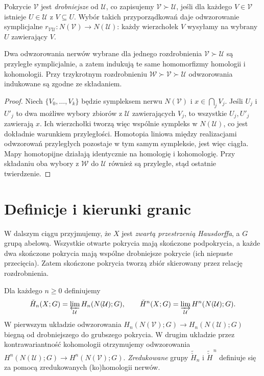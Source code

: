 \begin{definicja}[Rozdrobnienie]
Pokrycie $\mathcal V$ jest \emph{drobniejsze} od $\mathcal U$,
co zapisujemy $\mathcal V\succ\mathcal U$, jeśli dla każdego
$V\in\mathcal V$ istnieje $U\in\mathcal U$ z $V\subseteq U$.
Wybór takich przyporządkowań daje odwzorowanie symplicjalne
$r_{\mathcal V\mathcal U}:N(\mathcal V)\to N(\mathcal U)$:
każdy wierzchołek $V$ wysyłamy na wybrany $U$ zawierający $V$.
\end{definicja}

\begin{lemat}
\label{lem:cech-contiguity-v4}
Dwa odwzorowania nerwów wybrane dla jednego rozdrobnienia
$\mathcal V\succ\mathcal U$ są przyległe symplicjalnie,
a zatem indukują te same homomorfizmy homologii i kohomologii.
Przy trzykrotnym rozdrobnieniu $\mathcal W\succ\mathcal V\succ
\mathcal U$ odwzorowania indukowane są zgodne ze składaniem.
\end{lemat}
\begin{proof}
Niech $\{V_0,\ldots,V_k\}$ będzie sympleksem nerwu
$N(\mathcal V)$ i $x\in\bigcap_j V_j$.
Jeśli $U_j$ i $U'_j$ to dwa możliwe wybory zbiorów z
$\mathcal U$ zawierających $V_j$, to wszystkie $U_j,U'_j$
zawierają $x$. Ich wierzchołki tworzą więc wspólnie sympleks
w $N(\mathcal U)$, co jest dokładnie warunkiem przyległości.
Homotopia liniowa między realizacjami odwzorowań przyległych
pozostaje w tym samym sympleksie, jest więc ciągła.
Mapy homotopijne działają identycznie na homologię i kohomologię.
Przy składaniu oba wybory z $\mathcal W$ do $\mathcal U$
również są przyległe, stąd ostatnie twierdzenie.
\end{proof}

\section{Definicje i kierunki granic}
W dalszym ciągu przyjmujemy, że $X$ jest \emph{zwartą przestrzenią
Hausdorffa}, a $G$ grupą abelową. Wszystkie otwarte pokrycia
mają skończone podpokrycia, a każde dwa skończone pokrycia
mają wspólne drobniejsze pokrycie (ich niepuste przecięcia).
Zatem skończone pokrycia tworzą zbiór skierowany przez
relację rozdrobnienia.

\begin{definicja}
Dla każdego $n\ge0$ definiujemy
\[
\check H_n(X;G)=\varprojlim_{\mathcal U} H_n(N(\mathcal U);G),
\qquad
\check H^n(X;G)=\varinjlim_{\mathcal U}H^n(N(\mathcal U);G).
\]
W pierwszym układzie odwzorowania $H_n(N(\mathcal V);G)\to
H_n(N(\mathcal U);G)$ biegną od drobniejszego do grubszego
pokrycia. W drugim układzie przez kontrawariantność
kohomologii otrzymujemy odwzorowania
$H^n(N(\mathcal U);G)\to H^n(N(\mathcal V);G)$.
\emph{Zredukowane} grupy $\widetilde{\check H}_n$ i
$\widetilde{\check H}^{\,n}$ definiuje się za pomocą
zredukowanych (ko)homologii nerwów.
\end{definicja}

